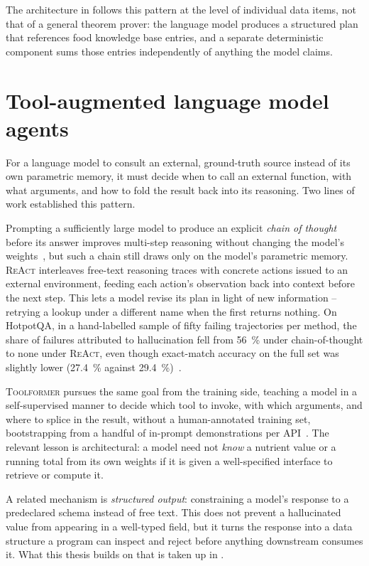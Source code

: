 The architecture in  follows this pattern at the level of individual data items, not that of a general theorem prover: the language model produces a structured plan that references food knowledge base entries, and a separate deterministic component sums those entries independently of anything the model claims.

\section{Tool-augmented language model agents}
\label{sec:background-tool-use}

For a language model to consult an external, ground-truth source instead of its own parametric memory, it must decide when to call an external function, with what arguments, and how to fold the result back into its reasoning. Two lines of work established this pattern.

Prompting a sufficiently large model to produce an explicit \emph{chain of thought} before its answer improves multi-step reasoning without changing the model's weights~\cite{wei2022chain}, but such a chain still draws only on the model's parametric memory. \textsc{ReAct} interleaves free-text reasoning traces with concrete actions issued to an external environment, feeding each action's observation back into context before the next step. This lets a model revise its plan in light of new information -- retrying a lookup under a different name when the first returns nothing. On HotpotQA, in a hand-labelled sample of fifty failing trajectories per method, the share of failures attributed to hallucination fell from \qty{56}{\percent} under chain-of-thought to none under \textsc{ReAct}, even though exact-match accuracy on the full set was slightly lower (\qty{27.4}{\percent} against \qty{29.4}{\percent})~\cite{yao2023react}.

\textsc{Toolformer} pursues the same goal from the training side, teaching a model in a self-supervised manner to decide which tool to invoke, with which arguments, and where to splice in the result, without a human-annotated training set, bootstrapping from a handful of in-prompt demonstrations per API~\cite{schick2023toolformer}. The relevant lesson is architectural: a model need not \emph{know} a nutrient value or a running total from its own weights if it is given a well-specified interface to retrieve or compute it.

A related mechanism is \emph{structured output}: constraining a model's response to a predeclared schema instead of free text. This does not prevent a hallucinated value from appearing in a well-typed field, but it turns the response into a data structure a program can inspect and reject before anything downstream consumes it. What this thesis builds on that is taken up in .

